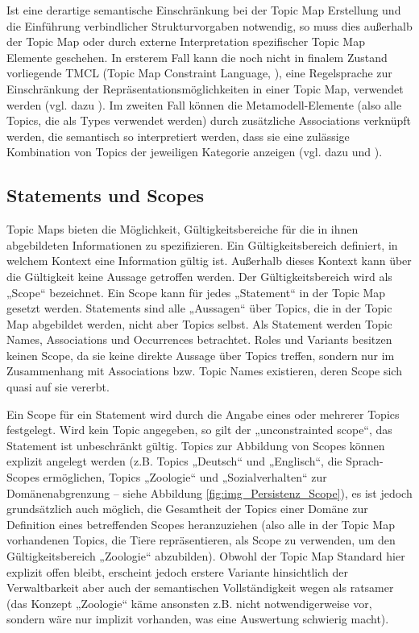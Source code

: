 Ist eine derartige semantische Einschränkung bei der Topic Map Erstellung und die Einführung verbindlicher Strukturvorgaben notwendig, so muss dies außerhalb der Topic Map oder durch externe Interpretation spezifischer Topic Map Elemente geschehen. In ersterem Fall kann die noch nicht in finalem Zustand vorliegende TMCL (Topic Map Constraint Language, \citep{TMCL08}), eine Regelsprache zur Einschränkung der Repräsentationsmöglichkeiten in einer Topic Map, verwendet werden (vgl. dazu \cite{Mayrhauser10}). Im zweiten Fall können die Metamodell-Elemente (also alle Topics, die als Types verwendet werden) durch zusätzliche Associations verknüpft werden, die semantisch so interpretiert werden, dass sie eine zulässige Kombination von Topics der jeweiligen Kategorie anzeigen (vgl. dazu \citep{Oppl07} und \citep{Neubauer08}). 


\subsection{Statements und Scopes} %
\label{sub:scopes}

Topic Maps bieten die Möglichkeit, Gültigkeitsbereiche für die in ihnen abgebildeten Informationen zu spezifizieren. Ein Gültigkeitsbereich definiert, in welchem Kontext eine Information gültig ist. Außerhalb dieses Kontext kann über die Gültigkeit keine Aussage getroffen werden. Der Gültigkeitsbereich wird als „Scope“ bezeichnet. Ein Scope kann für jedes „Statement“ in der Topic Map gesetzt werden. Statements sind alle „Aussagen“ über Topics, die in der Topic Map abgebildet werden, nicht aber Topics selbst. Als Statement werden Topic Names, Associations und Occurrences betrachtet. Roles und Variants besitzen keinen Scope, da sie keine direkte Aussage über Topics treffen, sondern nur im Zusammenhang mit Associations bzw. Topic Names existieren, deren Scope sich quasi auf sie vererbt.

Ein Scope für ein Statement wird durch die Angabe eines oder mehrerer Topics festgelegt. Wird kein Topic angegeben, so gilt der „unconstrainted scope“, das Statement ist unbeschränkt gültig. Topics zur Abbildung von Scopes können explizit angelegt werden (z.B. Topics „Deutsch“ und „Englisch“, die Sprach-Scopes ermöglichen, Topics „Zoologie“ und „Sozialverhalten“ zur Domänenabgrenzung -- siehe Abbildung \ref{fig:img_Persistenz_Scope}), es ist jedoch grundsätzlich auch möglich, die Gesamtheit der Topics einer Domäne zur Definition eines betreffenden Scopes heranzuziehen (also alle in der Topic Map vorhandenen Topics, die Tiere repräsentieren, als Scope zu verwenden, um den Gültigkeitsbereich „Zoologie“ abzubilden). Obwohl der Topic Map Standard hier explizit offen bleibt, erscheint jedoch erstere Variante hinsichtlich der Verwaltbarkeit aber auch der semantischen Vollständigkeit wegen als ratsamer (das Konzept „Zoologie“ käme ansonsten z.B. nicht notwendigerweise vor, sondern wäre nur implizit vorhanden, was eine Auswertung schwierig macht).

